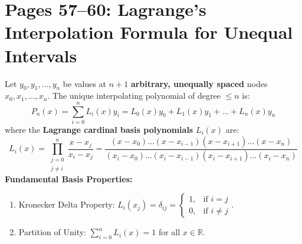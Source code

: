 \section{Pages 57--60: Lagrange's Interpolation Formula for Unequal Intervals}
\label{sec:lagrange_interpolation}

\begin{theorembox}
Let $y_0, y_1, \dots, y_n$ be values at $n+1$ \textbf{arbitrary, unequally spaced} nodes $x_0, x_1, \dots, x_n$.
The unique interpolating polynomial of degree $\le n$ is:
\begin{equation}
    \boxed{P_n(x) = \sum_{i=0}^n L_i(x) y_i = L_0(x)y_0 + L_1(x)y_1 + \dots + L_n(x)y_n}
\end{equation}
where the \textbf{Lagrange cardinal basis polynomials} $L_i(x)$ are:
\begin{equation}
    \boxed{L_i(x) = \prod_{\substack{j=0 \\ j \ne i}}^n \frac{x - x_j}{x_i - x_j} = \frac{(x - x_0)\dots(x - x_{i-1})(x - x_{i+1})\dots(x - x_n)}{(x_i - x_0)\dots(x_i - x_{i-1})(x_i - x_{i+1})\dots(x_i - x_n)}}
\end{equation}
\textbf{Fundamental Basis Properties:}
\begin{enumerate}
    \item Kronecker Delta Property: $L_i(x_j) = \delta_{ij} = \begin{cases} 1, & \text{if } i = j \\ 0, & \text{if } i \ne j \end{cases}$.
    \item Partition of Unity: $\sum_{i=0}^n L_i(x) = 1$ for all $x \in \mathbb{R}$.
\end{enumerate}
\end{theorembox}

